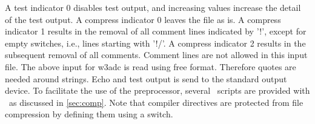 


\noindent
A test indicator 0 disables test output, and increasing values increase the
detail of the test output. A compress indicator 0 leaves the file as is. A
compress indicator 1 results in the removal of all comment lines indicated by
'{\F !}', except for empty switches, i.e., lines starting with '{\F !/}'. A
compress indicator 2 results in the subsequent removal of all comments.
Comment lines are not allowed in this input file. The above input for {\F
w3adc} is read using free format. Therefore quotes are needed around
strings. Echo and test output is send to the standard output device. To
facilitate the use of the preprocessor, several \unix\ scripts are provided
with \ws\ as discussed in \para\ref{sec:comp}. Note that compiler directives
are protected from file compression by defining them using a switch.

